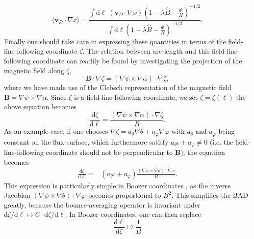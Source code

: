 \begin{equation}
    \langle \mathbf{v}_D \cdot \nabla x \rangle = \frac{\int \mathrm{d} \ell \; (\mathbf{v}_D \cdot \nabla x) \left(1 - \lambda \hat{B} - \frac{\Phi}{H} \right)^{-1/2}  }{\int \mathrm{d} \ell  \left(1 - \lambda \hat{B} - \frac{\Phi}{H} \right)^{-1/2} }.
    \label{eq:direct-averaging-integral}
\end{equation}
Finally one should take care in expressing these quantities in terms of the field-line-following coordinate $\zeta$. The relation between arc-length and this field-line-following coordinate can readily be found by investigating the projection of the magnetic field along $\zeta$,
\begin{equation}
    \mathbf{B} \cdot \nabla \zeta = \left( \nabla \psi \times \nabla \alpha \right) \cdot \nabla \zeta,
\end{equation}
where we have made use of the Clebsch representation of the magnetic field $\mathbf{B} = \nabla \psi \times\nabla \alpha$.
Since $\zeta$ is a field-line-following coordinate, we set $\zeta = \zeta(\ell)$ the above equation becomes
\begin{equation}
    \frac{\mathrm{d} \zeta}{\mathrm{d} \ell} = \frac{\left( \nabla \psi \times \nabla \alpha \right) \cdot \nabla \zeta}{B}.
\end{equation}
As an example case, if one chooses $\nabla \zeta = a_\theta \nabla \theta + a_\varphi \nabla \varphi$ with $a_\theta$ and $a_\varphi$ being constant on the flux-surface, which furthermore satisfy $a_\theta \iota + a_\varphi \neq 0 $ (i.e. the field-line-following coordinate should not be perpendicular to $\mathbf{B}$), the equation becomes
\begin{equation}
\begin{aligned}
    \frac{\mathrm{d} \zeta}{\mathrm{d} \ell} =& (a_\theta \iota + a_\varphi) \frac{\left( \nabla \psi \times \nabla \theta \right) \cdot \nabla \varphi}{B}.
\end{aligned}
\end{equation}
This expression is particularly simple in Boozer coordinates \cite{boozer1981plasma,helander2014theory}, as the inverse Jacobian $(\nabla \psi \times \nabla \theta ) \cdot \nabla \varphi$ becomes proportional to $B^2$. This simplifies the BAD greatly, because the bounce-averaging operator is invariant under $\mathrm{d}\zeta/\mathrm{d} \ell \mapsto C \cdot \mathrm{d}\zeta/\mathrm{d} \ell $. In Boozer coordinates, one can then replace
\begin{equation}
    \frac{\mathrm{d} \ell}{\mathrm{d} \zeta} \mapsto \frac{1}{B}
\end{equation}
